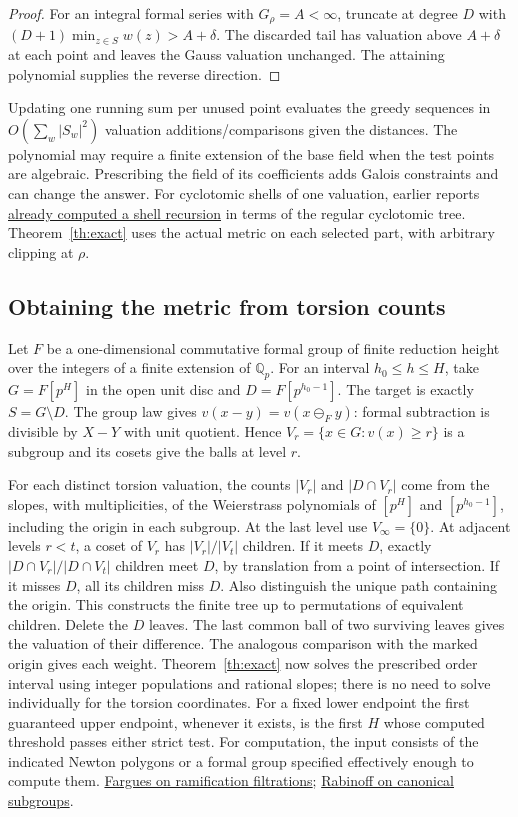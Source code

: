 \begin{proof}
For an integral formal series with $G_\rho=A<\infty$, truncate at degree
$D$ with $(D+1)\min_{z\in S}w(z)>A+\delta$. The discarded tail
has valuation above $A+\delta$ at each point and leaves the Gauss
valuation unchanged. The attaining polynomial supplies the reverse direction.
\end{proof}

Updating one running sum per unused point evaluates the greedy sequences
in $O(\sum_w |S_w|^2)$ valuation additions/comparisons given the distances.
The polynomial may require a finite extension of the base field when the
test points are algebraic. Prescribing the field of its coefficients adds
Galois constraints and can change the answer.
For cyclotomic shells of one valuation, earlier reports
\href{https://github.com/VladimirReshetnikov/ProveIt/blob/d31039a48d963692e5a5176f47b6603fc9e9d9cf/docs/incoming/grh_sharp_torsion_and_symplectic_blocks.zip}{already computed a shell recursion}
in terms of the regular cyclotomic tree. Theorem~\ref{th:exact} uses
the actual metric on each selected part, with arbitrary clipping at $\rho$.

\subsection{Obtaining the metric from torsion counts}
Let $F$ be a one-dimensional commutative formal group of finite
reduction height over the integers of a finite extension of $\mathbb Q_p$.
For an interval $h_0\le h\le H$, take $G=F[p^H]$ in the open unit disc and
$D=F[p^{h_0-1}]$. The target is exactly $S=G\setminus D$.
The group law gives $v(x-y)=v(x\mathbin{\ominus_F}y)$: formal subtraction
is divisible by $X-Y$ with unit quotient. Hence $V_r=\{x\in G:v(x)\ge r\}$
is a subgroup and its cosets give the balls at level $r$.

For each distinct torsion valuation, the counts $|V_r|$ and
$|D\cap V_r|$ come from the slopes, with multiplicities, of the
Weierstrass polynomials of $[p^H]$ and $[p^{h_0-1}]$, including the origin
in each subgroup. At the last level use $V_\infty=\{0\}$.
At adjacent levels $r<t$, a coset of $V_r$ has $|V_r|/|V_t|$ children.
If it meets $D$, exactly $|D\cap V_r|/|D\cap V_t|$ children meet $D$,
by translation from a point of intersection. If it misses $D$, all its
children miss $D$. Also distinguish the unique path containing the origin.
This constructs the finite tree up to permutations of equivalent children.
Delete the $D$ leaves. The last common ball of two surviving leaves gives
the valuation of their difference. The analogous comparison with the
marked origin gives each weight. Theorem~\ref{th:exact} now solves the
prescribed order interval using integer populations and rational slopes;
there is no need to solve individually for the torsion coordinates.
For a fixed lower endpoint the first guaranteed upper endpoint, whenever
it exists, is the first $H$ whose computed threshold passes either strict test.
For computation, the input consists of the indicated Newton polygons or
a formal group specified effectively enough to compute them.
\href{https://arxiv.org/abs/math/0604252}{Fargues on ramification filtrations};
\href{https://arxiv.org/abs/0910.3323}{Rabinoff on canonical subgroups}.

